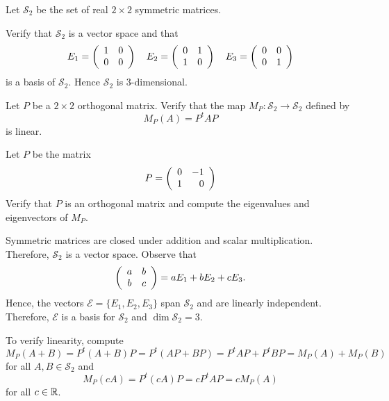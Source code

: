 \documentclass{ximera}
\author{Marty Golubitsky}
\begin{document}

\begin{exercise}\label{c10.3.10}

Let $\mathcal{S}_2$ be the set of real $2\times 2$ symmetric matrices.
\begin{enumeratea}
\item Verify that $\mathcal{S}_2$ is a vector space and that 
\begin{equation} \label{e:sym_mat_base}
E_1 = \left(\begin{array}{cccccccccccc} 1 & 0 \\ 0 & 0 \end{array}\right) \quad E_2 = \left(\begin{array}{cccccccccccc} 0& 1\\ 1 & 0 \end{array}\right) \quad E_3 = \left(\begin{array}{rrrrrrrrrrrrrrrrrr} 0 & 0 \\ 0 & 1 \end{array}\right)
\end{equation}
is a basis of $\mathcal{S}_2$.  Hence $\mathcal{S}_2$ is  3-dimensional.
\item Let $P$ be a $2\times 2$ orthogonal matrix.  Verify that the map $M_P: \mathcal{S}_2 \to \mathcal{S}_2$ defined by 
\[
M_P(A) = P^tAP
\]
is linear.

\item Let $P$ be the matrix 
\begin{equation} \label{e:reflection_matrix}
P = \left(\begin{array}{rrrrrrrrrrrrrrrrrr} 0 & -1 \\ 1 & 0  \end{array}\right)
\end{equation}
Verify that $P$ is an orthogonal matrix and compute the eigenvalues and eigenvectors of $M_P$.
\end{enumeratea}

\begin{solution}
\soln 
\begin{enumeratea}
\item Symmetric matrices are closed under addition and scalar multiplication.  Therefore, $\mathcal{S}_2$ is a vector space.
Observe that 
\[
\left(\begin{array}{cccccccccccc} a & b \\ b & c \end{array}\right) = aE_1 + bE_2 + cE_3.
\]
Hence, the vectors $\mathcal{E} = \{E_1,E_2,E_3\}$ span $\mathcal{S}_2$ and are linearly independent.  Therefore,  $\mathcal{E}$ is a basis for $\mathcal{S}_2 $ and $\dim \mathcal{S}_2 = 3$.

\item To verify linearity, compute
\[
M_P(A+B) = P^t(A+B)P = P^t(AP + BP) = P^tAP + P^tBP = M_P(A) + M_P(B)
\]
for all $A,B\in \mathcal{S}_2$ and
\[ 
M_P(cA) = P^t(cA)P = c P^tAP = cM_P(A)
\]
for all $c\in\mbox{$\mathbb{R}$}$.


\end{enumeratea}
\end{solution}
\end{exercise}
\end{document}
